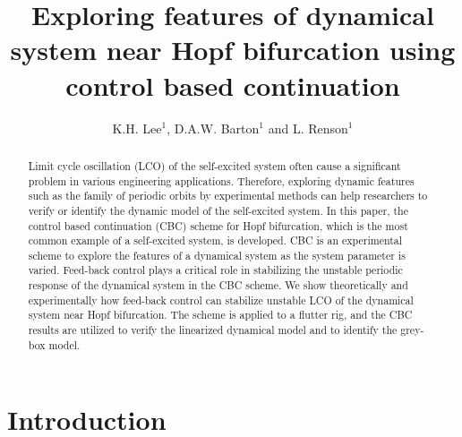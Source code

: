 \documentclass[openacc]{rsproca_new}%
\begin{document}



\title{Exploring features of dynamical system near Hopf bifurcation using control based continuation}

\author{%
K.H. Lee$^{1}$, D.A.W. Barton$^{1}$ and L. Renson$^{1}$}

\address{$^{1}$Department of Engineering Mathematics, University of Bristol\\}

\subject{mechanical engineering, differential equations}



\begin{abstract}
 Limit cycle oscillation (LCO) of the self-excited system often cause a significant problem in various engineering applications. Therefore, exploring dynamic features such as the family of periodic orbits by experimental methods can help researchers to verify or identify the dynamic model of the self-excited system. In this paper, the control based continuation (CBC) scheme for Hopf bifurcation, which is the most common example of a self-excited system, is developed. CBC is an experimental scheme to explore the features of a dynamical system as the system parameter is varied. Feed-back control plays a critical role in stabilizing the unstable periodic response of the dynamical system in the CBC scheme. We show theoretically and experimentally how feed-back control can stabilize unstable LCO of the dynamical system near Hopf bifurcation. The scheme is applied to a flutter rig, and the CBC results are utilized to verify the linearized dynamical model and to identify the grey-box model.
\end{abstract}

\maketitle

\section{Introduction}\label{int}
\end{document}
